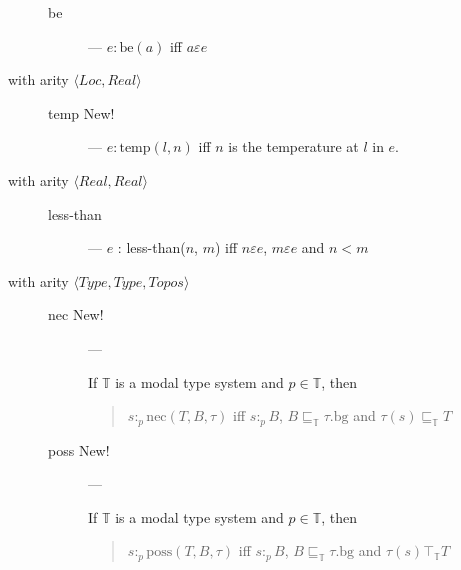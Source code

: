 \begin{description}
  \begin{description}
    
  \item[\textnormal{be}] --- $e:\text{be}(a)$ iff $a\varepsilon e$

  \end{description}

  
\item[with arity
  \textnormal{$\langle\textit{Loc},\textit{Real}\rangle$}] \mbox{}
  \begin{description}
    
  \item[\textnormal{temp} New!] --- $e:\text{temp}(l,n)$ iff $n$ is
    the temperature at $l$ in $e$.

    
  

  \end{description}
  
\item[with arity
  \textnormal{$\langle\textit{Real},\textit{Real}\rangle$}] \mbox{}

  \begin{description}
    
  \item[\textnormal{less-than}] --- $e$ : less-than($n$, $m$) iff $n\varepsilon e$, $m\varepsilon e$ and $n<m$

  \end{description}

\item[with arity
  \textnormal{$\langle\textit{Type},\textit{Type},\textit{Topos}\rangle$}]
  \mbox{}

  \begin{description}

    
  \item[\textnormal{nec} New!] ---

    If $\mathbb{T}$ is a modal type system and $p\in\mathbb{T}$, then
    \begin{quote}
      $s:_p\mathrm{nec}(T,B,\tau)$ iff $s:_pB$, 
      $B\sqsubseteq_{\mathbb{T}}\tau.\mathrm{bg}$ and 
      $\tau(s)\sqsubseteq_{\mathbb{T}}T$
    \end{quote}

    
  \item[\textnormal{poss} New!] ---

    If $\mathbb{T}$ is a modal type system and $p\in\mathbb{T}$, then
    \begin{quote}
      $s:_p\mathrm{poss}(T,B,\tau)$ iff $s:_pB$, 
      $B\sqsubseteq_{\mathbb{T}}\tau.\mathrm{bg}$ and 
      $\tau(s)\top_{\mathbb{T}}T$
    \end{quote}


\end{description}
\end{description}
